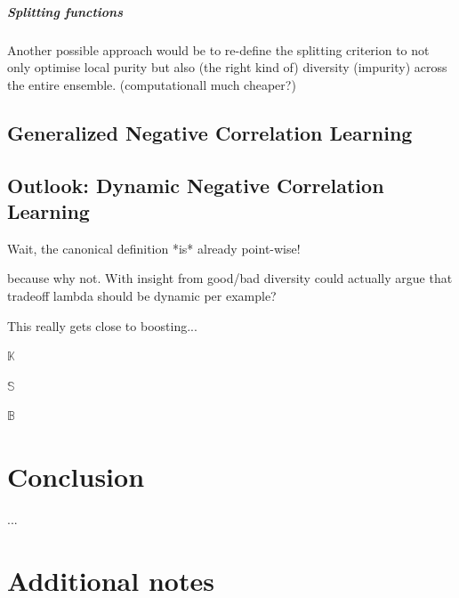 \documentclass[
    a4paper, %
	fontsize=10pt, %
	twoside=false, %
]{kaobook}
\begin{document}
\paragraph{Splitting functions} Another possible approach would be to re-define the splitting criterion to not only optimise local purity but also (the right kind of) diversity (impurity) across the entire ensemble. (computationall much cheaper?)

\section{Generalized Negative Correlation Learning}




\section{Outlook: Dynamic Negative Correlation Learning}

Wait, the canonical definition *is* already point-wise!

because why not. 
With insight from good/bad diversity could actually argue that tradeoff lambda should be dynamic per example?

This really gets close to boosting...

$\mathbb{K}$

$\mathbb{S}$

$\mathbb{B}$

\chapter{Conclusion}
...



\appendix %


\chapter{Additional notes}
\end{document}
